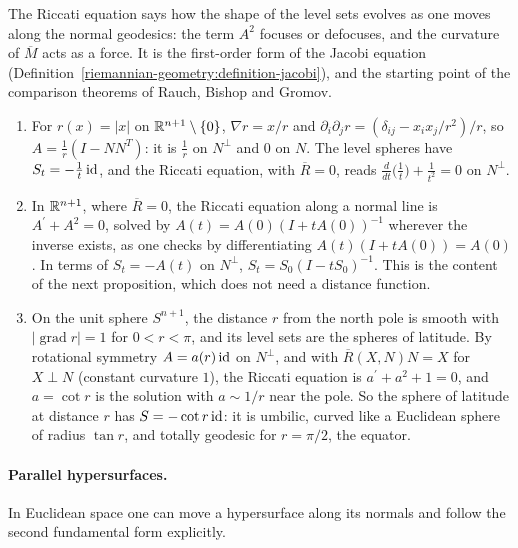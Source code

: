 The Riccati equation says how the shape of the level sets evolves as one moves along the normal geodesics: the term $A^2$ focuses or defocuses, and the curvature of $\overline{M}$ acts as a force. It is
the first-order form of the Jacobi equation (Definition~\ref{riemannian-geometry:definition-jacobi}), and the starting point of the comparison theorems of Rauch, Bishop and Gromov.

\begin{example}\label{riemannian-geometry:example-distance-functions}
\begin{enumerate}
\item For $r(x) = |x|$ on $\mathbb{R}^{n+1} \setminus \{0\}$, $\nabla r = x/r$ and $\partial_i\partial_jr = (\delta_{ij} - x_ix_j/r^2)/r$, so $A = \frac1r(I - NN^T)$: it is $\frac1r$ on $N^\perp$ and $0$ on $N$. The level spheres
have $S_t = -\frac1t\,\mathrm{id}$, and the Riccati equation, with $\overline{R} = 0$, reads $\frac{d}{dt}\bigl(\frac1t\bigr) + \frac{1}{t^2} = 0$ on $N^\perp$.
\item In $\mathbb{R}^{n+1}$, where $\overline{R} = 0$, the Riccati equation along a normal line is $A^{\prime} + A^2 = 0$, solved by $A(t) = A(0)(I + tA(0))^{-1}$ wherever the inverse exists, as one checks by
differentiating $A(t)(I + tA(0)) = A(0)$. In terms of $S_t = -A(t)$ on $N^\perp$, $S_t = S_0(I - tS_0)^{-1}$. This is the content of the next proposition, which does not need a distance function.
\item On the unit sphere $S^{n+1}$, the distance $r$ from the north pole is smooth with $|\operatorname{grad}r| = 1$ for $0 < r < \pi$, and its level sets are the spheres of latitude. By rotational symmetry
$A = a(r)\,\mathrm{id}$ on $N^\perp$, and with $\overline{R}(X, N)N = X$ for $X \perp N$ (constant curvature $1$), the Riccati equation is $a^{\prime} + a^2 + 1 = 0$, and $a = \cot r$ is the solution with $a \sim 1/r$ near the pole.
So the sphere of latitude at distance $r$ has $S = -\cot r\,\mathrm{id}$: it is umbilic, curved like a Euclidean sphere of radius $\tan r$, and totally geodesic for $r = \pi/2$, the equator.
\end{enumerate}
\end{example}

\paragraph{Parallel hypersurfaces.} In Euclidean space one can move a hypersurface along its normals and follow the second fundamental form explicitly.

